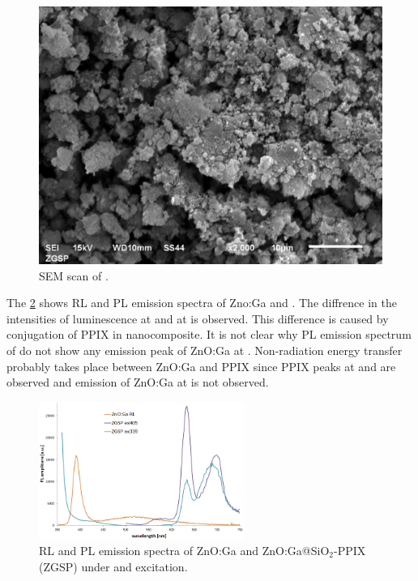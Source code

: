 \begin{figure}
        \hspace*{\fill}%
    \begin{minipage}{.3\textwidth}
        \includegraphics[width=\textwidth]{pictures/sem_ZGSP_10_mikro.png}
        \caption{SEM scan of {\znoo}.}
        \label{fig:sem_zgsp}
    \end{minipage}
        \hspace*{\fill}%
\end{figure}

    The \cref{fig:znoga_januar_rt_pl} shows RL and PL emission spectra of Zno:Ga and {\znoo}. The diffrence in the intensities of luminescence at  and at  is observed. This difference is caused by conjugation of PPIX in nanocomposite. It is not clear why PL emission spectrum of {\znoo} do not show any emission peak of ZnO:Ga at . Non-radiation energy transfer probably takes place between ZnO:Ga and PPIX since PPIX peaks at  and  are observed and emission of ZnO:Ga at  is not observed.\\
    
    \begin{figure}[h]
        \centering
        \includegraphics[width=0.6\textwidth]{pictures/znoga_januar_rt_pl.PNG}
        \caption{RL and PL emission spectra of ZnO:Ga and ZnO:Ga@SiO$_{2}$-PPIX (ZGSP) under  and  excitation.}
        \label{fig:znoga_januar_rt_pl}
    \end{figure}
    

